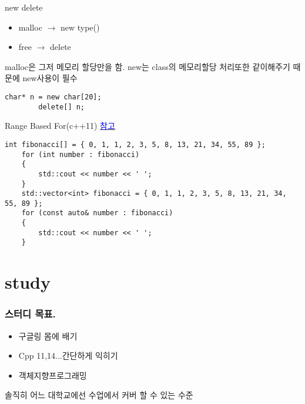 \documentclass[10pt]{beamer}
\begin{document}

\begin{frame}[fragile]{new delete}
    \begin{itemize}
        \item malloc $\rightarrow$ new type()
        \item free $\rightarrow$ delete 
    \end{itemize}
    malloc은 그저 메모리 할당만을 함. new는 class의 메모리할당 처리또한 같이해주기 때문에 new사용이 필수
    \begin{lstlisting}[style = CppStyle]
        char* n = new char[20];
        delete[] n;
    \end{lstlisting}
\end{frame}


\begin{frame}[fragile]{Range Based For(c++11)}
    \href{https://www.youtube.com/watch?v=sVoz36DYK5s&list=PLW_uvsSPlijtSmrhajc3Y02G86lOieQOb}{\textcolor{blue}{참고}}
    
    \begin{lstlisting}[style = CppStyle]
    int fibonacci[] = { 0, 1, 1, 2, 3, 5, 8, 13, 21, 34, 55, 89 }; 
    for (int number : fibonacci)
    {
        std::cout << number << ' ';
    }
    std::vector<int> fibonacci = { 0, 1, 1, 2, 3, 5, 8, 13, 21, 34, 55, 89 }; 
    for (const auto& number : fibonacci) 
    {
        std::cout << number << ' ';
    }
    \end{lstlisting}

\end{frame}    

\section{study}


\begin{frame}[fragile] 
    \frametitle{스터디 목표.}
    \begin{itemize}
        \item 구글링 몸에 배기
        \item Cpp 11,14...간단하게 익히기
        \item 객체지향프로그래밍
    \end{itemize}
    솔직히 어느 대학교에선 수업에서 커버 할 수 있는 수준
\end{frame}
\end{document}
